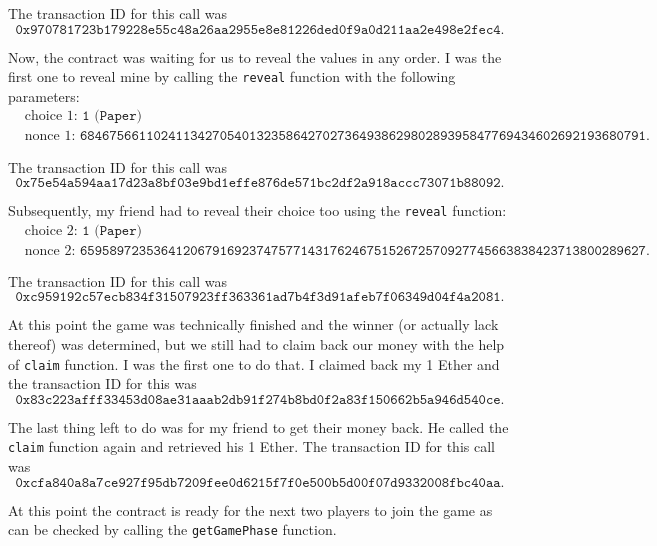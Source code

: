 \documentclass{article}
\begin{document}
    \noindent The transaction ID for this call was
    \[
        \texttt{0x970781723b179228e55c48a26aa2955e8e81226ded0f9a0d211aa2e498e2fec4}.
    \]

    \noindent Now, the contract was waiting for us to reveal
    the values in any order. I was the first one to reveal
    mine by calling the \verb|reveal| function with the
    following parameters:
    \[
    \begin{split}
        &\text{choice 1: }\texttt{1 (Paper)}\\
        &\text{nonce 1: }\texttt{68467566110241134270540132358642702736493862980289395847769434602692193680791}.
    \end{split}
    \]

    \noindent The transaction ID for this call was
    \[
        \texttt{0x75e54a594aa17d23a8bf03e9bd1effe876de571bc2df2a918accc73071b88092}.
    \]

    \noindent Subsequently, my friend had to reveal their
    choice too using the \verb|reveal| function:
    \[
    \begin{split}
        &\text{choice 2: }\texttt{1 (Paper)}\\
        &\text{nonce 2: }\texttt{65958972353641206791692374757714317624675152672570927745663838423713800289627}.
    \end{split}
    \]

    \noindent The transaction ID for this call was
    \[
        \texttt{0xc959192c57ecb834f31507923ff363361ad7b4f3d91afeb7f06349d04f4a2081}.
    \]

    \noindent At this point the game was technically
    finished and the winner (or actually lack thereof) was
    determined, but we still had to claim back our money
    with the help of \verb|claim| function. I was the first
    one to do that. I claimed back my 1 Ether and the
    transaction ID for this was
    \[
        \texttt{0x83c223afff33453d08ae31aaab2db91f274b8bd0f2a83f150662b5a946d540ce}.
    \]

    \noindent The last thing left to do was for my friend to
    get their money back. He called the \verb|claim|
    function again and retrieved his 1 Ether. The transaction
    ID for this call was
    \[
        \texttt{0xcfa840a8a7ce927f95db7209fee0d6215f7f0e500b5d00f07d9332008fbc40aa}.
    \]

    \noindent At this point the contract is ready for the
    next two players to join the game as can be checked by
    calling the \verb|getGamePhase| function.
\end{document}
